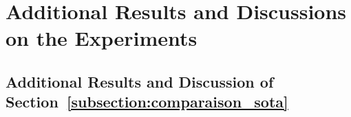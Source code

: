 



\section{Additional Results and Discussions on the Experiments}



\subsection{Additional Results and Discussion of Section~\ref{subsection:comparaison_sota}}


